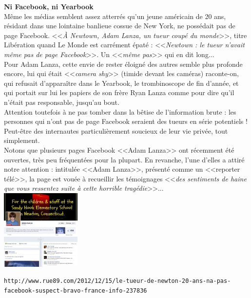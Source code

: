 \documentclass[11pt,twoside,a4paper]{article}
\begin{document}
\textbf{Ni Facebook, ni Yearbook} ~\\

M{\^e}me les m{\'e}dias semblent assez atterr{\'e}s qu'un jeune am{\'e}ricain de 20 ans, r{\'e}sidant dans une lointaine banlieue cossue de New York, ne poss{\'e}dait pas de page Facebook. <<\emph{{\`A} Newtown, Adam Lanza, un tueur coup{\'e} du monde}>>, titre Lib{\'e}ration quand Le Monde est carr{\'e}ment {\'e}pat{\'e} : <<\emph{Newtown : le tueur n'avait m{\^e}me pas de page Facebook}>>. Un <<\emph{m{\^e}me pas}>> qui en dit long... ~\\

Pour Adam Lanza, cette envie de rester {\'e}loign{\'e} des autres semble plus profonde encore, lui qui {\'e}tait <<\emph{camera shy}>> (timide devant les cam{\'e}ras) raconte-on, qui refusait d'appara{\^i}tre dans le Yearbook, le trombinoscope de fin d'ann{\'e}e, et qui portait sur lui les papiers de son fr{\`e}re Ryan Lanza comme pour dire qu'il n'{\'e}tait pas responsable, jusqu'au bout. ~\\

Attention toutefois {\`a} ne pas tomber dans la b{\^e}tise de l'information brute : les personnes qui n'ont pas de page Facebook seraient des tueurs en s{\'e}rie potentiels ! Peut-{\^e}tre des internautes particuli{\`e}rement soucieux de leur vie priv{\'e}e, tout simplement. ~\\

Notons que plusieurs pages Facebook <<Adam Lanza>> ont r{\'e}cemment {\'e}t{\'e} ouvertes, tr{\`e}s peu fr{\'e}quent{\'e}es pour la plupart. En revanche, l'une d'elles a attir{\'e} notre attention : intitul{\'e}e <<Adam Lanza>>, pr{\'e}sent{\'e} comme un <<reporter t{\'e}l{\'e}>>, la page est vou{\'e}e {\`a} recueillir les t{\'e}moignages <<\emph{des sentiments de haine que vous ressentez suite {\`a} cette horrible trag{\'e}die}>>... ~\\

\includegraphics[width=0.30\textwidth]{img/Falanza.jpg}

\clearpage

\texttt{http://www.rue89.com/2012/12/15/le-tueur-de-newton-20-ans-na-pas-facebook-suspect-bravo-france-info-237836}~\\
\end{document}
